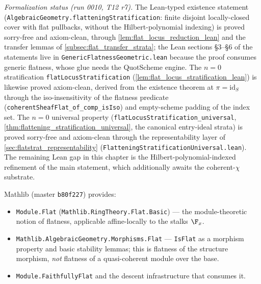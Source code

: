 \emph{Formalization status (run 0010, T12 r7).}  The Lean-typed existence
statement (\texttt{AlgebraicGeometry.flatteningStratification}: finite
disjoint locally-closed cover with flat pullbacks, without the
Hilbert-polynomial indexing) is proved sorry-free and axiom-clean, through
\cref{lem:flat_locus_reduction_lean} and the transfer lemmas of
\cref{subsec:flat_transfer_strata}; the Lean sections \S3--\S6 of the
statements live in \texttt{GenericFlatnessGeometric.lean} because the proof
consumes generic flatness, whose glue needs the QuotScheme engine.  The
\(n = 0\) stratification \texttt{flatLocusStratification}
(\cref{lem:flat_locus_stratification_lean}) is likewise proved axiom-clean,
derived from the existence theorem at \(\pi = \mathrm{id}_S\) through the
iso-insensitivity of the flatness predicate
(\texttt{coherentSheafFlat\_of\_comp\_isIso}) and empty-scheme padding of
the index set.  The \(n = 0\) universal property
(\texttt{flatLocusStratification\_universal},
\cref{thm:flattening_stratification_universal}, the canonical entry-ideal
strata) is proved sorry-free and axiom-clean through the representability
layer of \cref{sec:flatstrat_representability}
(\texttt{FlatteningStratificationUniversal.lean}).  The remaining Lean gap
in this chapter is the Hilbert-polynomial-indexed refinement of the main
statement, which additionally awaits the coherent-\(\chi\) substrate.

Mathlib (master \texttt{b80f227}) provides:
\begin{itemize}
  \item \texttt{Module.Flat} (\texttt{Mathlib.RingTheory.Flat.Basic}) --- the
    module-theoretic notion of flatness, applicable affine-locally to the
    stalks \(\F_x\).
  \item \texttt{Mathlib.AlgebraicGeometry.Morphisms.Flat} ---
    \texttt{IsFlat} as a morphism property and basic stability lemmas; this is
    flatness of the structure morphism, \emph{not} flatness of a quasi-coherent
    module over the base.
  \item \texttt{Module.FaithfullyFlat} and the descent infrastructure that
    consumes it.
\end{itemize}

